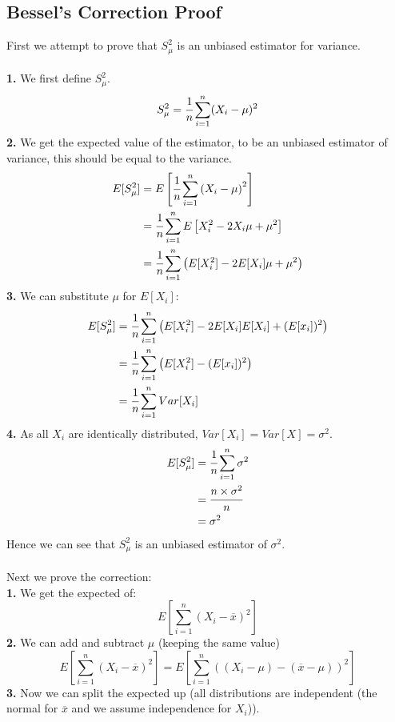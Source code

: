 \documentclass{report}
\begin{document}
\subsection*{Bessel's Correction Proof}
First we attempt to prove that $S_\mu^2$ is an unbiased estimator for variance.
\\
\\ \textbf{1.} We first define $S_\mu^2$.
\[S_\mu^2 = \cfrac{1}{n}\sum_{i=1}^n(X_i - \mu)^2\]
\textbf{2. } We get the expected value of the estimator, to be an unbiased estimator of variance, this should be equal to the variance.
\[\begin{split}
		E[S_\mu^2] &= E\left[ \cfrac{1}{n} \sum_{i = 1}^n \left( X_i - \mu \right)^2 \right] \\
		&= \cfrac{1}{n}\sum_{i = 1}^n E\left[X_i^2 - 2X_i\mu + \mu^2 \right] \\
		&= \cfrac{1}{n}\sum_{i = 1}^n \left( E[X_i^2] - 2E[X_i]\mu + \mu^2 \right) \\
	\end{split}\]
\textbf{3. } We can substitute $\mu$ for $E[X_i]$:
\[\begin{split}
		E[S_\mu^2] &= \cfrac{1}{n}\sum_{i = 1}^n \left( E[X_i^2] - 2E[X_i]E[X_i] + (E[x_i])^2 \right) \\
		&= \cfrac{1}{n}\sum_{i = 1}^n \left( E[X_i^2] - (E[x_i])^2 \right) \\
		&= \cfrac{1}{n}\sum_{i = 1}^n Var[X_i] \\
	\end{split} \]
\textbf{4. } As all $X_i$ are identically distributed, $Var[X_i] = Var[X] = \sigma^2$.
\[\begin{split}
		E[S_\mu^2] &= \cfrac{1}{n}\sum_{i = 1}^n \sigma^2 \\
		&= \cfrac{n \times \sigma^2}{n} \\
		&= \sigma^2 \\
	\end{split}\]
Hence we can see that $S^2_\mu$ is an unbiased estimator of $\sigma^2$.
\\
\\ Next we prove the correction:
\\ \textbf{1. } We get the expected of:
\[E\left[ \sum_{i = 1}^n ( X_i - \overline{x} )^2 \right]\]
\textbf{2. } We can add and subtract $\mu$ (keeping the same value)
\[E\left[ \sum_{i = 1}^n ( X_i - \overline{x} )^2 \right] = E\left[ \sum_{i = 1}^n ( (X_i - \mu) - (\overline{x} - \mu) )^2 \right]\]
\textbf{3. } Now we can split the expected up (all distributions are independent (the normal for $\overline{x}$ and we assume independence for $X_i$)).
\end{document}
